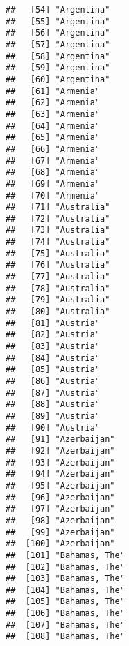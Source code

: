 \documentclass[]{article}
\begin{document}
\begin{verbatim}
##   [54] "Argentina"                          
##   [55] "Argentina"                          
##   [56] "Argentina"                          
##   [57] "Argentina"                          
##   [58] "Argentina"                          
##   [59] "Argentina"                          
##   [60] "Argentina"                          
##   [61] "Armenia"                            
##   [62] "Armenia"                            
##   [63] "Armenia"                            
##   [64] "Armenia"                            
##   [65] "Armenia"                            
##   [66] "Armenia"                            
##   [67] "Armenia"                            
##   [68] "Armenia"                            
##   [69] "Armenia"                            
##   [70] "Armenia"                            
##   [71] "Australia"                          
##   [72] "Australia"                          
##   [73] "Australia"                          
##   [74] "Australia"                          
##   [75] "Australia"                          
##   [76] "Australia"                          
##   [77] "Australia"                          
##   [78] "Australia"                          
##   [79] "Australia"                          
##   [80] "Australia"                          
##   [81] "Austria"                            
##   [82] "Austria"                            
##   [83] "Austria"                            
##   [84] "Austria"                            
##   [85] "Austria"                            
##   [86] "Austria"                            
##   [87] "Austria"                            
##   [88] "Austria"                            
##   [89] "Austria"                            
##   [90] "Austria"                            
##   [91] "Azerbaijan"                         
##   [92] "Azerbaijan"                         
##   [93] "Azerbaijan"                         
##   [94] "Azerbaijan"                         
##   [95] "Azerbaijan"                         
##   [96] "Azerbaijan"                         
##   [97] "Azerbaijan"                         
##   [98] "Azerbaijan"                         
##   [99] "Azerbaijan"                         
##  [100] "Azerbaijan"                         
##  [101] "Bahamas, The"                       
##  [102] "Bahamas, The"                       
##  [103] "Bahamas, The"                       
##  [104] "Bahamas, The"                       
##  [105] "Bahamas, The"                       
##  [106] "Bahamas, The"                       
##  [107] "Bahamas, The"                       
##  [108] "Bahamas, The"                       

\end{verbatim}
\end{document}
